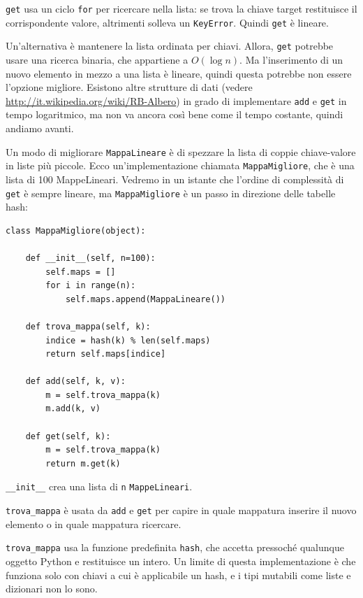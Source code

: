 \documentclass[10pt]{book}
\begin{document}
{\tt get} usa un ciclo {\tt for} per ricercare nella lista: se trova la chiave target restituisce il corrispondente valore, altrimenti solleva un {\tt KeyError}. Quindi {\tt get} è lineare.

Un'alternativa è mantenere la lista ordinata per chiavi. Allora, {\tt get}
potrebbe usare una ricerca binaria, che appartiene a $O(\log n)$. Ma l'inserimento di un nuovo elemento in mezzo a una lista è lineare, quindi questa potrebbe non essere l'opzione migliore. Esistono altre strutture di dati (vedere
  \url{http://it.wikipedia.org/wiki/RB-Albero}) in grado di implementare {\tt add} e {\tt get} in tempo logaritmico, ma non va ancora così bene come il tempo costante, quindi andiamo avanti.
  

Un modo di migliorare {\tt MappaLineare} è di spezzare la lista di coppie chiave-valore in liste più piccole. Ecco un'implementazione chiamata
{\tt MappaMigliore}, che è una lista di 100 MappeLineari.  Vedremo in un istante che l'ordine di complessità di {\tt get} è sempre lineare, ma {\tt MappaMigliore} è un passo in direzione delle tabelle hash:

\begin{verbatim}
class MappaMigliore(object):

    def __init__(self, n=100):
        self.maps = []
        for i in range(n):
            self.maps.append(MappaLineare())

    def trova_mappa(self, k):
        indice = hash(k) % len(self.maps)
        return self.maps[indice]

    def add(self, k, v):
        m = self.trova_mappa(k)
        m.add(k, v)

    def get(self, k):
        m = self.trova_mappa(k)
        return m.get(k)
\end{verbatim}

\verb"__init__" crea una lista di {\tt n} {\tt MappeLineari}.

\verb"trova_mappa" è usata da
{\tt add} e {\tt get} per capire in quale mappatura inserire il nuovo elemento o in quale mappatura ricercare.

\verb"trova_mappa" usa la funzione predefinita {\tt hash}, che accetta pressoché qualunque oggetto Python e restituisce un intero. Un limite di questa implementazione è che funziona solo con chiavi a cui è applicabile un hash, e i tipi mutabili come liste e dizionari non lo sono.
\end{document}
